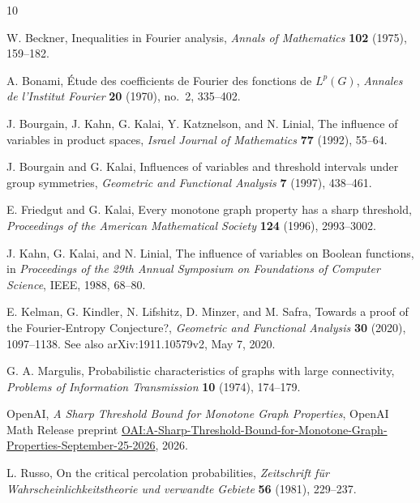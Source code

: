 \begin{thebibliography}{10}

W. Beckner, Inequalities in Fourier analysis,
\emph{Annals of Mathematics} \textbf{102} (1975), 159--182.

A. Bonami, \'{E}tude des coefficients de Fourier des fonctions de
$L^p(G)$, \emph{Annales de l'Institut Fourier} \textbf{20} (1970),
no.~2, 335--402.

J. Bourgain, J. Kahn, G. Kalai, Y. Katznelson, and N. Linial,
The influence of variables in product spaces,
\emph{Israel Journal of Mathematics} \textbf{77} (1992), 55--64.

J. Bourgain and G. Kalai, Influences of variables and threshold
intervals under group symmetries,
\emph{Geometric and Functional Analysis} \textbf{7} (1997), 438--461.

E. Friedgut and G. Kalai, Every monotone graph property has a sharp
threshold, \emph{Proceedings of the American Mathematical Society}
\textbf{124} (1996), 2993--3002.

J. Kahn, G. Kalai, and N. Linial, The influence of variables on Boolean
functions, in \emph{Proceedings of the 29th Annual Symposium on
Foundations of Computer Science}, IEEE, 1988, 68--80.

E. Kelman, G. Kindler, N. Lifshitz, D. Minzer, and M. Safra,
Towards a proof of the Fourier-Entropy Conjecture?,
\emph{Geometric and Functional Analysis} \textbf{30} (2020), 1097--1138.
See also arXiv:1911.10579v2, May 7, 2020.

G. A. Margulis, Probabilistic characteristics of graphs with large
connectivity, \emph{Problems of Information Transmission}
\textbf{10} (1974), 174--179.

OpenAI, \emph{A Sharp Threshold Bound for Monotone Graph Properties},
OpenAI Math Release preprint
\href{https://github.com/openai/math/blob/main/preprints/A-Sharp-Threshold-Bound-for-Monotone-Graph-Properties-September-25-2026/paper.pdf}{OAI:A-Sharp-Threshold-Bound-for-Monotone-Graph-Properties-September-25-2026},
2026.

L. Russo, On the critical percolation probabilities,
\emph{Zeitschrift f\"ur Wahrscheinlichkeitstheorie und verwandte Gebiete}
\textbf{56} (1981), 229--237.

\end{thebibliography}
